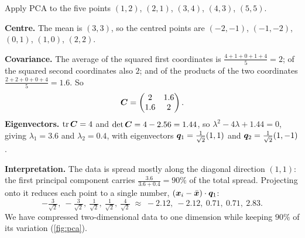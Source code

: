\begin{example}\label{ex:pca}
Apply PCA to the five points $(1, 2)$, $(2, 1)$, $(3, 4)$, $(4, 3)$, $(5, 5)$.

\sol \textbf{Centre.} The mean is $(3, 3)$, so the centred points are
$(-2, -1)$, $(-1, -2)$, $(0, 1)$, $(1, 0)$, $(2, 2)$.

\textbf{Covariance.} The average of the squared first coordinates is
$\frac{4 + 1 + 0 + 1 + 4}{5} = 2$; of the squared second coordinates also $2$;
and of the products of the two coordinates $\frac{2 + 2 + 0 + 0 + 4}{5} =
1.6$. So
\[
  \bm{C} = \begin{pmatrix} 2 & 1.6\\ 1.6 & 2\end{pmatrix}.
\]
\textbf{Eigenvectors.} $\operatorname{tr}\bm{C} = 4$ and $\det\bm{C} = 4 - 2.56 = 1.44$, so
$\lambda^2 - 4\lambda + 1.44 = 0$, giving $\lambda_1 = 3.6$ and $\lambda_2 = 0.4$,
with eigenvectors $\bm{q}_1 = \frac{1}{\sqrt2}(1, 1)$ and
$\bm{q}_2 = \frac{1}{\sqrt2}(1, -1)$.

\textbf{Interpretation.} The data is spread mostly along the diagonal
direction $(1, 1)$: the first principal component carries
$\frac{3.6}{3.6 + 0.4} = 90\%$ of the total spread. Projecting onto it reduces
each point to a single number, $(\bm{x}_i - \bar{\bm{x}})\cdot\bm{q}_1$:
\[
  -\tfrac{3}{\sqrt2},\ -\tfrac{3}{\sqrt2},\ \tfrac{1}{\sqrt2},\
  \tfrac{1}{\sqrt2},\ \tfrac{4}{\sqrt2}
  \;\approx\; -2.12,\ -2.12,\ 0.71,\ 0.71,\ 2.83 .
\]
We have compressed two-dimensional data to one dimension while keeping $90\%$
of its variation (\cref{fig:pca}).
\end{example}

